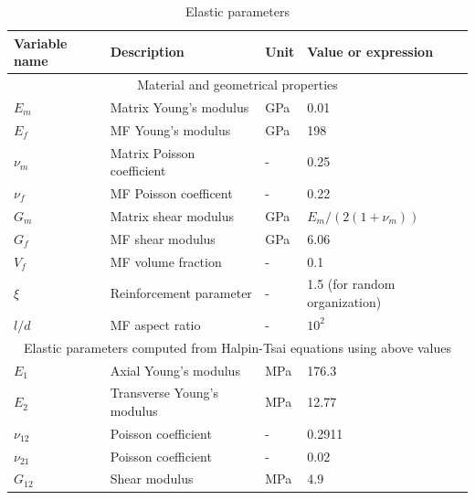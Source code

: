 \documentclass[]{article}
\begin{document}
\begin{center}	
	\begin{table}\label{table1}
		\centering
		\begin{tabular}{llll}                                                                    
			Variable name      & Description                      & Unit  & Value or expression  \\
			\hline\hline 
			\multicolumn{4}{c}{Material and geometrical properties}\\
			$E_m$                 & Matrix Young's modulus                      & GPa  & 0.01    \\  
			$E_f$                 & MF Young's modulus                    & GPa & 198 \citep{son21}    \\  
			$\nu_m$                  & Matrix Poisson coefficient                       & -  & 0.25    \\
			$\nu_f$            & MF Poisson coefficent & - & 0.22  \citep{son21}      \\
			$G_m$ & Matrix shear modulus & GPa & $E_m/(2(1+\nu_m))$ \\
			$G_f$ & MF shear modulus & GPa & 6.06 \citep{son21} \\
			$V_{f}$        & MF volume fraction     & - & 0.1      \\
			$\xi$        & Reinforcement parameter     & - & 1.5 (for random organization)      \\
			$l/d$        & MF aspect ratio     & - & $10^2$     \\
			\hline
			\multicolumn{4}{c}{Elastic parameters computed from Halpin-Tsai equations using above values}\\
			$E_1$                 & Axial Young's modulus                     & MPa  & 176.3    \\  
			$E_2$                 & Transverse Young's modulus                    & MPa & 12.77  \\  
			$\nu_{12}$                  & Poisson coefficient                       & -  & 0.2911   \\
			$\nu_{21}$            & Poisson coefficient   & - & 0.02 \\
			$G_{12}$            & Shear modulus   & MPa & 4.9 \\
		\end{tabular}
		\caption{Elastic parameters}
	\end{table}
\end{center}
\end{document}
